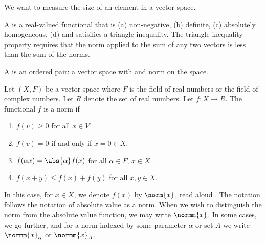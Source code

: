 

We want to measure
the size of an element
in a vector space.


A
is a real-valued
functional that is
(a) non-negative,
(b) definite,
(c) absolutely homogeneous,
(d) and satisifies a
triangle inequality.
The triangle inequality property
requires that the norm applied
to the sum of any two vectors
is less than the sum of the norms.

A 
is an ordered
pair: a vector space with
and norm on the space.


Let $(X, F)$ be a vector
space where $F$ is the
field of real numbers
or the field of
complex numbers.
Let $R$ denote
the set of real numbers.
Let $f: X \to R$.
The functional $f$ is a norm
if
\begin{enumerate}
  \item $f(v) \geq 0$ for all $x \in V$
  \item $f(v) = 0$ if and only if $x = 0 \in X$.
  \item $f(\alpha x) = \abs{\alpha}f(x)$ for all $\alpha \in F$, $x \in X$
  \item $f(x + y) \leq f(x) + f(y)$ for all $x, y \in X$.
\end{enumerate}

In this case, for $x \in X$,
we denote $f(x)$ by $\norm{x}$,
read aloud .
The notation follows the notation
of absolute value as a norm.
When we wish to distinguish
the norm from the absolute
value function, we may write
$\normm{x}$. In some cases,
we go further, and for a norm
indexed by some parameter $\alpha$
or set $A$ we write $\normm{x}_\alpha$
or $\normm{x}_A$.
